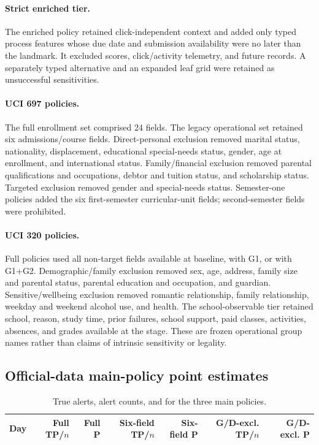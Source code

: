 \paragraph{Strict enriched tier.}
The enriched policy retained click-independent context and added only typed process features whose due date and submission availability were no later than the landmark. It excluded scores, click/activity telemetry, and future records. A separately typed alternative and an expanded leaf grid were retained as unsuccessful sensitivities.

\paragraph{UCI 697 policies.}
The full enrollment set comprised 24 fields. The legacy operational set retained six admissions/course fields. Direct-personal exclusion removed marital status, nationality, displacement, educational special-needs status, gender, age at enrollment, and international status. Family/financial exclusion removed parental qualifications and occupations, debtor and tuition status, and scholarship status. Targeted exclusion removed gender and special-needs status. Semester-one policies added the six first-semester curricular-unit fields; second-semester fields were prohibited.

\paragraph{UCI 320 policies.}
Full policies used all non-target fields available at baseline, with G1, or with G1+G2. Demographic/family exclusion removed sex, age, address, family size and parental status, parental education and occupation, and guardian. Sensitive/wellbeing exclusion removed romantic relationship, family relationship, weekday and weekend alcohol use, and health. The school-observable tier retained school, reason, study time, prior failures, school support, paid classes, activities, absences, and grades available at the stage. These are frozen operational group names rather than claims of intrinsic sensitivity or legality.

\subsection{Official-data main-policy point estimates}

\begin{table}[htbp]
\centering
\caption{True alerts, alert counts, and \Pten{} for the three main policies.}
\label{tab:s_main_points}
\small
\setlength{\tabcolsep}{3.3pt}
\begin{tabular}{rrrrrrr}
\toprule
Day & Full TP/$n$ & Full P & Six-field TP/$n$ & Six-field P & G/D-excl. TP/$n$ & G/D-excl. P \\
\midrule

\end{tabular}
\end{table}
\FloatBarrier

